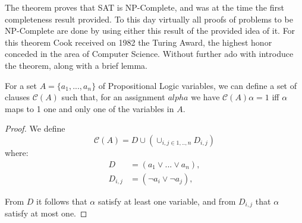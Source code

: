 The theorem proves that SAT is NP-Complete, and was at the time the first completeness result provided. To this day virtually all proofs of problems to be NP-Complete are done by using either this result of the provided idea of it. For this theorem Cook received on 1982 the Turing Award, the highest honor conceded in the area of Computer Science. Without further ado with introduce the theorem, along with a brief lemma.\\




\begin{lemma}
  For a set $A = \{a_1,...,a_n\}$ of Propositional Logic variables, we can define a set of clauses $\mathcal{C}(A)$ such that, for an assignment $alpha$ we have   $\mathcal{C}(A)\alpha = 1$ iff $\alpha$ maps to 1 one and only one of the variables in $A$.
\end{lemma}
\begin{proof}
  We define $$\mathcal{C}(A) = D\cup \left (  \cup_{i,j \in 1,..,n} D_{i,j} \right )$$ where:
  \begin{equation}
    \begin{split}
      D & = (a_1 \vee ... \vee a_n ),\\
      D_{i,j} & = (\neg a_{i} \vee \neg a_{j} ),
\end{split}
\end{equation}

From $D$ it follows that $\alpha$ satisfy at least one variable, and from $D_{i,j}$ that $\alpha$ satisfy at most one.
\end{proof}


